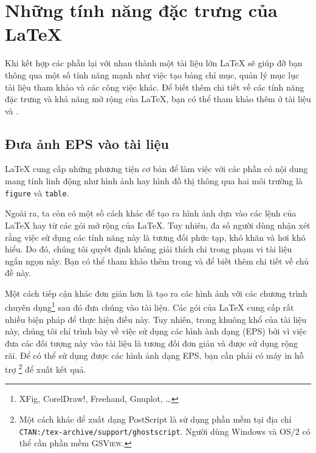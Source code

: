 \chapter{Những tính năng đặc trưng của \LaTeX{}}
\begin{intro}
  Khi kết hợp các phần lại với nhau thành một tài liệu lớn \LaTeX{} sẽ giúp đỡ bạn thông qua một số tính năng mạnh như việc tạo bảng chỉ mục, quản lý mục lục tài liệu tham khảo và các công việc khác. Để biết thêm chi tiết về các tính năng đặc trưng và khả năng mở rộng của \LaTeX{}, bạn có thể tham khảo thêm ở tài liệu {\normalfont\manual{}} và {\normalfont \companion}.
\end{intro}

\section{Đưa ảnh EPS vào tài liệu}\label{eps}
\LaTeX{} cung cấp những phương tiện cơ bản để làm việc với các phần có nội dung mang tính linh động như hình ảnh hay hình đồ thị thông qua hai môi trường là \texttt{figure} và \texttt{table}.

Ngoài ra, ta còn có một số cách khác để tạo ra hình ảnh dựa vào các lệnh của \LaTeX{} hay từ các gói mở rộng của \LaTeX{}. Tuy nhiên, đa số người dùng nhận xét rằng việc sử dụng các tính năng này là tương đối phức tạp, khó khăn và hơi khó hiểu. Do đó, chúng tôi quyết định không giải thích chi trong phạm vi tài liệu ngắn ngọn này. Bạn có thể tham khảo thêm trong \companion{} và \manual{} để biết thêm chi tiết về chủ đề này.

Một cách tiếp cận khác đơn giản hơn là tạo ra các hình ảnh với các chương trình chuyên dụng\footnote{XFig, CorelDraw!, Freehand, Gnuplot, \ldots} sau đó đưa chúng vào tài liệu. Các gói của \LaTeX{} cung cấp rất nhiều biện pháp để thực hiện điều này. Tuy nhiên, trong khuông khổ của tài liệu này, chúng tôi chỉ trình bày về việc sử dụng các hình ành dạng  (EPS) bởi vì việc đưa các đối tượng này vào tài liệu là tương đối đơn giản và được sử dụng rộng rãi. Để có thể sử dụng được các hình ảnh dạng EPS, bạn cần phải có máy in hỗ trợ \footnote{Một cách khác để xuất dạng PostScript là sử dụng phần mềm \textsc{} tại địa chỉ \texttt{CTAN:/tex-archive/support/ghostscript}. Người dùng Windows và OS/2 có thể cần phần mềm \textsc{GSView}.} để xuất kết quả.

